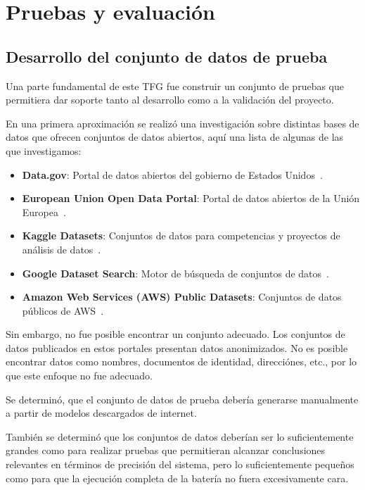 \section{Pruebas y evaluación}\label{sec:pruebas_y_evaluacion}

\subsection*{Desarrollo del conjunto de datos de prueba}

Una parte fundamental de este TFG fue construir un conjunto de pruebas que permitiera dar soporte tanto al
desarrollo como a la validación del proyecto.

En una primera aproximación se realizó una investigación sobre distintas bases de datos que ofrecen
conjuntos de datos abiertos, aquí una lista de algunas de las que investigamos:

\begin{itemize}
    \item \textbf{Data.gov}: Portal de datos abiertos del gobierno de Estados Unidos~\cite{url_us_open_data}.
    \item \textbf{European Union Open Data Portal}: Portal de datos abiertos de la Unión
    Europea~\cite{url_eu_open_data}.
    \item \textbf{Kaggle Datasets}: Conjuntos de datos para competencias y proyectos de análisis de
    datos~\cite{url_kaggle}.
    \item \textbf{Google Dataset Search}: Motor de búsqueda de conjuntos de
    datos~\cite{url_google_open_data}.
    \item \textbf{Amazon Web Services (AWS) Public Datasets}: Conjuntos de datos públicos de
    AWS~\cite{url_aws_open_data}.
\end{itemize}

Sin embargo, no fue posible encontrar un conjunto adecuado.
Los conjuntos de datos publicados en estos portales presentan datos anonimizados.
No es posible encontrar datos como nombres, documentos de identidad, direcciónes, etc., por lo que este enfoque no fue
adecuado.

Se determinó, que el conjunto de datos de prueba debería generarse manualmente a partir de modelos descargados de
internet.

También se determinó que los conjuntos de datos deberían ser lo suficientemente grandes como para realizar pruebas que
permitieran alcanzar conclusiones relevantes en términos de precisión del sistema, pero lo suficientemente pequeños
como para que la ejecución completa de la batería no fuera excesivamente cara.

